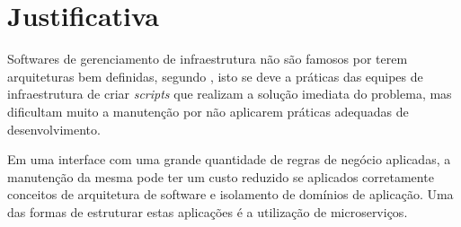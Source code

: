 \section{Justificativa}

  Softwares de gerenciamento de infraestrutura não são famosos por terem
  arquiteturas bem definidas, segundo , isto
  se deve a práticas das equipes de infraestrutura de criar \textit{scripts}
  que realizam a solução imediata do problema, mas dificultam muito a
  manutenção por não aplicarem práticas adequadas de desenvolvimento.

  Em uma interface com uma grande quantidade de regras de negócio aplicadas,
  a manutenção da mesma pode ter um custo reduzido se aplicados corretamente
  conceitos de arquitetura de software e isolamento de domínios de aplicação.
  Uma das formas de estruturar estas aplicações é a utilização de
  microserviços.
